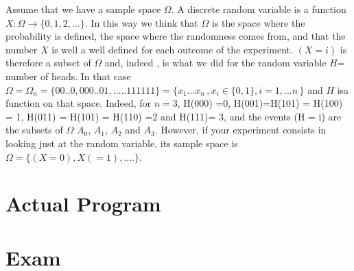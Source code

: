 \documentclass[12pt]{article}
\newcommand{\<}{{\langle \!\! \langle}}
\renewcommand{\>}{{\rangle \!\! \rangle}}
\begin{document}
Assume that we have a sample space $\Omega$. A discrete random variable is a function $X: \Omega \to \{0,1,2,...\}$.  
In this way we think that $\Omega $ is the space where the probability is defined, the space where the randomness comes from, and that the number $X$ is well a well defined for each outcome of the experiment.  $( X = i)$ is  therefore a subset of $\Omega $ and, indeed , is what we did for the random variable $H$= number of heads. In that case $\Omega = \Omega_n = \{00..0,000..01,.....111111\}=\{x_1...x_n\,, x_i\in\{0,1\}, i=1,...n\,\}$ and $H$ isa function on that space. Indeed, for $n=3$, H(000) =0, H(001)=H(101) = H(100) = 1, H(011) = H(101) = H(110) =2 and H(111)= 3, and the events  (H = i) are the subsets of $\Omega $ $A_0$, $A_1$, $A_2$ and $A_3$.
However, if your experiment consists in looking just at the random variable, its sample space is $\Omega = \{ (X = 0), X( =1) , ....\}$. 



\section{Actual Program}

\section{Exam}
\end{document}
